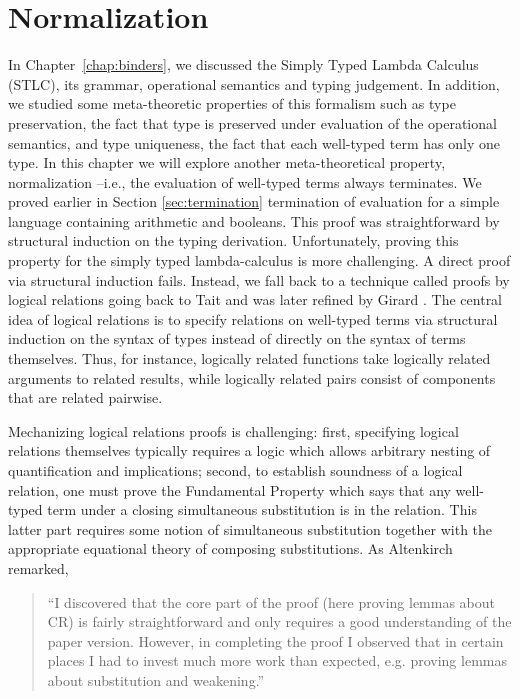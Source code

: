\chapter{Normalization}\label{chap:normalization}

In Chapter~\ref{chap:binders}, we discussed the Simply Typed Lambda
Calculus (STLC), its grammar, operational semantics and typing
judgement.  In addition, we studied some meta-theoretic properties of
this formalism such as type preservation, the fact that type is
preserved under evaluation of the operational semantics, and type
uniqueness, the fact that each well-typed term has only one type. In
this chapter we will explore another meta-theoretical property,
normalization --i.e., the evaluation of well-typed terms always
terminates. We proved earlier in Section \ref{sec:termination}
termination of evaluation for a simple language containing arithmetic
and booleans. This proof was straightforward by structural induction
on the typing derivation. Unfortunately, proving this property for the
simply typed lambda-calculus is more challenging. A direct proof via
structural induction fails. Instead, we fall back to a technique
called proofs by logical relations going back to Tait  \cite{Tait67}
and was later refined by Girard
\citep{GirardLafontTaylor:proofsAndTypes}. The central idea of logical
relations is to specify relations on well-typed terms via structural
induction on the syntax of types instead of directly on the syntax of
terms themselves. Thus, for instance, logically related functions take
logically related arguments to related results, while  logically
related pairs consist of components that are related pairwise. 

Mechanizing logical relations proofs is challenging: first, specifying logical relations themselves typically requires a logic which allows arbitrary nesting of quantification and implications; second, to establish soundness of a logical relation, one must prove the Fundamental Property which says that any well-typed term under a closing simultaneous substitution is in the relation. This latter part requires some notion of simultaneous substitution together with the appropriate equational theory of composing substitutions. As Altenkirch \cite{Altenkirch:TLCA93} remarked,

\begin{quote}
``I discovered that the core part of the proof (here proving lemmas about CR) is fairly straightforward and only requires a good understanding of the paper version. However, in completing the proof I observed that in certain places I had to invest much more work than expected, e.g. proving lemmas about substitution and weakening.'' 
\end{quote}

